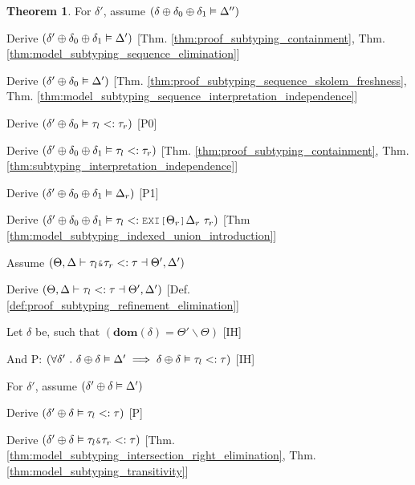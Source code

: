 \documentclass[acmsmall]{acmart}
\theoremstyle{definition}
\newtheorem{theorem}{Theorem}[section]
\begin{document}
\begin{theorem}
  \item \I \N For $\delta'$, assume $(
    \delta \oplus \delta_0 \oplus \delta_1 \vDash \Delta''
  )$


  \item \I\I \N Derive $(\delta' \oplus \delta_0 \oplus \delta_1 \vDash \Delta')$
    [Thm. \ref{thm:proof_subtyping_containment}, Thm. \ref{thm:model_subtyping_sequence_elimination}]
  \item \I\I \N Derive $(\delta' \oplus \delta_0 \vDash \Delta')$
    [Thm. \ref{thm:proof_subtyping_sequence_skolem_freshness}, Thm. \ref{thm:model_subtyping_sequence_interpretation_independence}]
  \item \I\I \N Derive $(
    \delta' \oplus \delta_0 \vDash \tau_l <: \tau_r
  )$ [P0]


  \item \I\I \N Derive $(
    \delta' \oplus \delta_0 \oplus \delta_1 \vDash \tau_l <: \tau_r
  )$ [Thm. \ref{thm:proof_subtyping_containment}, Thm. \ref{thm:subtyping_interpretation_independence}]


  \item \I\I \N Derive $(
    \delta' \oplus \delta_0 \oplus \delta_1 \vDash \Delta_r
  )$ [P1]

  \item \I\I \N Derive $(
    \delta' \oplus \delta_0 \oplus \delta_1 \satisfies \tau_l \subtypes \J{EXI[}\Theta_r\J{]}\Delta_r\ \tau_r
  )$ [Thm \ref{thm:model_subtyping_indexed_union_introduction}]


  \item \N Assume $(
    \Theta, \Delta \entails \tau_{l}\J{\&}\tau_{r}  \subtypes \tau \given \Theta', \Delta' 
  )$
  \item \I \N Derive $(
    \Theta, \Delta \vdash \tau_{l} <: \tau \dashv \Theta', \Delta'
  )$ [Def. \ref{def:proof_subtyping_refinement_elimination}]

  \item \I \N Let $\delta$ be, such that $(
    \textbf{dom}(\delta) = \Theta' \backslash \Theta
  )$ [IH]
  \item \I \N And P: $(
    \forall \delta' \ .\  
    \delta \oplus \delta \vDash \Delta' 
    \implies 
    \delta \oplus \delta \vDash \tau_l <: \tau
  )$ [IH]
  \item \I \N For $\delta'$, assume $(\delta' \oplus \delta \vDash \Delta')$
  \item \I\I \N Derive $(\delta' \oplus \delta \vDash \tau_l <: \tau)$ [P]
  \item \I\I \N Derive $(
    \delta' \oplus \delta \satisfies \tau_l \J{\&} \tau_r \subtypes \tau 
  )$ [Thm. \ref{thm:model_subtyping_intersection_right_elimination}, Thm. \ref{thm:model_subtyping_transitivity}]


\end{theorem}
\end{document}
